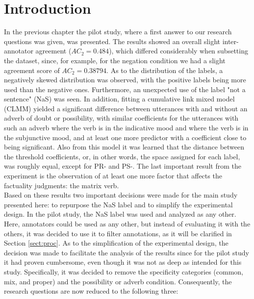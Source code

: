 \label{chap:main}

\section{Introduction}
In the previous chapter the pilot study, where a first answer to our research questions was given, was presented. The results showed an overall slight inter-annotator agreement ($AC_2=0.484$), which differed considerably when subsetting the dataset, since, for example, for the negation condition we had a slight agreement score of $AC_2=0.38794$. As to the distribution of the labels, a negatively skewed distribution was observed, with the positive labels being more used than the negative ones. Furthermore, an unexpected use of the label "not a sentence" (NaS) was seen. In addition, fitting a cumulative link mixed model (CLMM) yielded a significant difference between utterances with and without an adverb of doubt or possibility, with similar coefficients for the utterances with such an adverb where the verb is in the indicative mood and where the verb is in the subjunctive mood, and at least one more predictor with a coefficient close to being significant. Also from this model it was learned that the distance between the threshold coefficients, or, in other words, the space assigned for each label, was roughly equal, except for PR- and PS-. The last important result from the experiment is the observation of at least one more factor that affects the factuality judgments: the matrix verb.\\

Based on these results two important decisions were made for the main study presented here: to repurpose the NaS label and to simplify the experimental design. In the pilot study, the NaS label was used and analyzed as any other. Here, annotators could be used as any other, but instead of evaluating it with the others, it was decided to use it to filter annotations, as it will be clarified in Section \ref{sect:proc}. As to the simplification of the experimental design, the decision was made to facilitate the analysis of the results since for the pilot study it had proven cumbersome, even though it was not as deep as intended for this study. Specifically, it was decided to remove the specificity categories (common, mix, and proper) and the possibility or adverb condition. Consequently, the research questions are now reduced to the following three:\\


